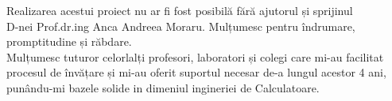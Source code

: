 \vspace*{7cm}
\begin{center}
Realizarea acestui proiect nu ar fi fost posibilă fără ajutorul și sprijinul\\
D-nei Prof.dr.ing Anca Andreea Moraru. Mulțumesc pentru îndrumare,\\
promptitudine și răbdare.\\
Mulțumesc tuturor celorlalți profesori, laboratori și colegi care mi-au facilitat\\
procesul de învățare și mi-au oferit suportul necesar de-a lungul acestor 4 ani, punându-mi
bazele solide in dimeniul ingineriei de Calculatoare.\\
\end{center}


